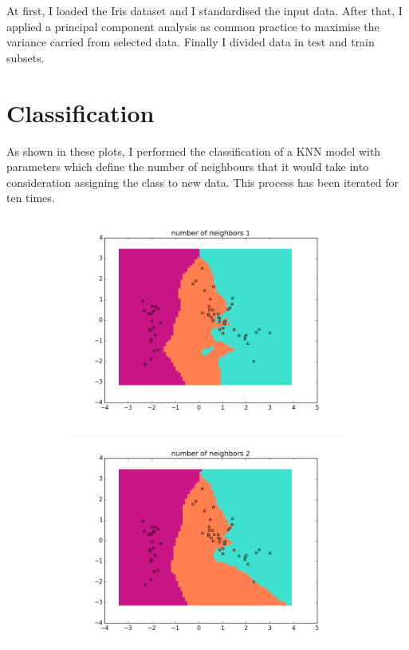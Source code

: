 \documentclass{article}
\begin{document}
	At first, I loaded the Iris dataset and I standardised the input data. After that, I applied a principal component analysis as common practice to maximise the variance carried from selected data.
	Finally I divided data in test and train subsets.
	
	
	

				\section{Classification}
				As shown in these plots, I performed  the classification of a KNN model with parameters which define the number of neighbours that it would take into consideration assigning the class to new data. This process has been iterated for ten times.
								\begin{center}
				\begin{figure}
\centering
        \begin{subfigure}[b]{0.48\textwidth}
                \centering
                \includegraphics[width=\linewidth]{figure_2}
        \end{subfigure}\hfill
        \begin{subfigure}[b]{0.48\textwidth}
                \centering
                \includegraphics[width=\linewidth]{figure_3}
        \end{subfigure}\hfill
 \label{fig:2}
 \end{figure}
       

\end{center}
\end{document}
